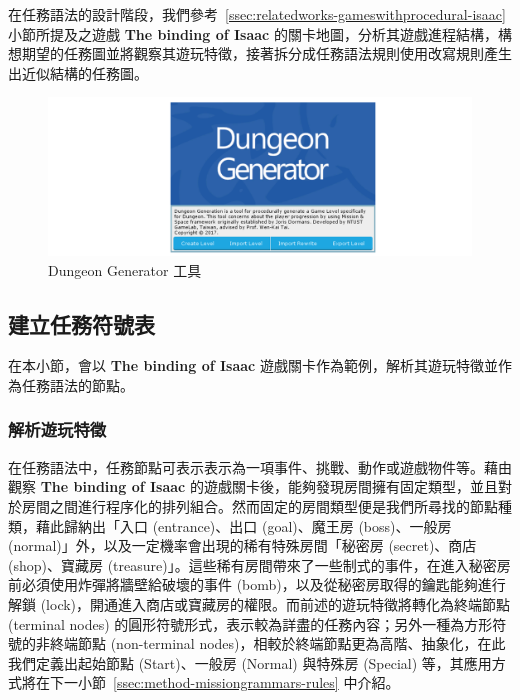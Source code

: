 在任務語法的設計階段，我們參考~\ref{ssec:relatedworks-gameswithprocedural-isaac} 小節所提及之遊戲 \textbf{The binding of Isaac} 的關卡地圖，分析其遊戲進程結構，構想期望的任務圖並將觀察其遊玩特徵，接著拆分成任務語法規則使用改寫規則產生出近似結構的任務圖。

\begin{figure}[ht]
  \begin{center}
    \includegraphics[width=1.0\textwidth]{figures/Dungeon_Generator_工具.png}
    \caption{Dungeon Generator 工具} 
    \label{fig:dungeon-generator}
  \end{center}
\end{figure}

\subsection{建立任務符號表}
\label{ssec:method-missiongrammars-alphabet}

在本小節，會以 \textbf{The binding of Isaac} 遊戲關卡作為範例，解析其遊玩特徵並作為任務語法的節點。

\subsubsection{解析遊玩特徵}
\label{sssec:method-missiongrammars-alphabet-extractpatterns}

在任務語法中，任務節點可表示表示為一項事件、挑戰、動作或遊戲物件等。藉由觀察 \textbf{The binding of Isaac} 的遊戲關卡後，能夠發現房間擁有固定類型，並且對於房間之間進行程序化的排列組合。然而固定的房間類型便是我們所尋找的節點種類，藉此歸納出「入口 (entrance)、出口 (goal)、魔王房 (boss)、一般房 (normal)」外，以及一定機率會出現的稀有特殊房間「秘密房 (secret)、商店 (shop)、寶藏房 (treasure)」。這些稀有房間帶來了一些制式的事件，在進入秘密房前必須使用炸彈將牆壁給破壞的事件 (bomb)，以及從秘密房取得的鑰匙能夠進行解鎖 (lock)，開通進入商店或寶藏房的權限。而前述的遊玩特徵將轉化為終端節點 (terminal nodes) 的圓形符號形式，表示較為詳盡的任務內容；另外一種為方形符號的非終端節點 (non-terminal nodes)，相較於終端節點更為高階、抽象化，在此我們定義出起始節點 (Start)、一般房 (Normal) 與特殊房 (Special) 等，其應用方式將在下一小節~\ref{ssec:method-missiongrammars-rules} 中介紹。

